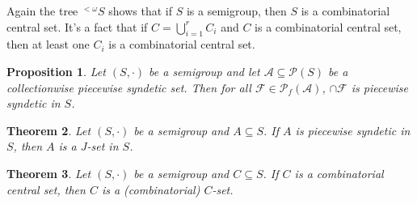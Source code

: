 \documentclass{article}
\theoremstyle{plain}
\newtheorem{thm}{Theorem}[section]
\newtheorem{prop}[thm]{Proposition}
\theoremstyle{definition}
\newcommand{\calA}{\mathcal{A}}
\newcommand{\calF}{\mathcal{F}}
\newcommand{\calP}{\mathcal{P}}
\newcommand{\Pf}{\mathcal{P}_f}
\begin{document}
Again the tree ${}^{<\omega}{S}$ shows that if $S$ is a semigroup,
then $S$ is a combinatorial central set. 
It's a fact that if $C = \bigcup_{i=1}^r C_i$ and $C$ is a
combinatorial central set, then at least one $C_i$ is a combinatorial
central set. 

\begin{prop}
  Let $(S, \cdot)$ be a semigroup and let $\calA \subseteq \calP(S)$
  be a collectionwise piecewise syndetic set.
  Then for all $\calF \in \Pf(\calA)$, $\cap \calF$ is piecewise
  syndetic in $S$.
\end{prop}

\begin{thm}
  Let $(S, \cdot)$ be a semigroup and $A \subseteq S$. 
  If $A$ is piecewise syndetic in $S$, then $A$ is a $J$-set in $S$. 
\end{thm}

\begin{thm}
  Let $(S, \cdot)$ be a semigroup and $C \subseteq S$. 
  If $C$ is a combinatorial central set, then $C$ is a (combinatorial)
  $C$-set.
\end{thm}



\end{document}
